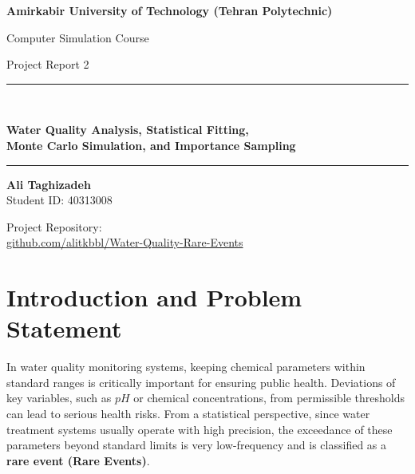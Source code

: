 \documentclass[12pt,a4paper]{article}
\begin{document}
	
	\begin{titlepage}
		\centering
		\vspace*{1cm}
		
		{\Large\bfseries Amirkabir University of Technology (Tehran Polytechnic)\par}
		\vspace{0.4cm}
		{\large Computer Simulation Course\par}
		
		\vspace{2.5cm}
		
		{\large Project Report 2\par}
		\vspace{1cm}
		\rule{\linewidth}{0.4pt}\\[0.6cm]
		{\LARGE\bfseries Water Quality Analysis, Statistical Fitting,\\[0.3cm]
			Monte Carlo Simulation, and Importance Sampling\par}
		\rule{\linewidth}{0.4pt}
		
		\vspace{2.5cm}
		
		{\large
			
			\textbf{Ali Taghizadeh}\\[0.2cm]
			Student ID: 40313008\par}
		
		\vfill
		
		{\normalsize
			Project Repository:\\[0.2cm]
			\href{https://github.com/alitkbbl/Water-Quality-Rare-Events}{github.com/alitkbbl/Water-Quality-Rare-Events}\par}
		
		\vspace{1.2cm}
		
	\end{titlepage}
	
	
	
	\setcounter{page}{1}
	
	
	\section{Introduction and Problem Statement}
	
	In water quality monitoring systems, keeping chemical parameters within standard ranges is critically important for ensuring public health. Deviations of key variables, such as $pH$ or chemical concentrations, from permissible thresholds can lead to serious health risks. From a statistical perspective, since water treatment systems usually operate with high precision, the exceedance of these parameters beyond standard limits is very low-frequency and is classified as a \textbf{rare event (Rare Events)}.
	
\end{document}
